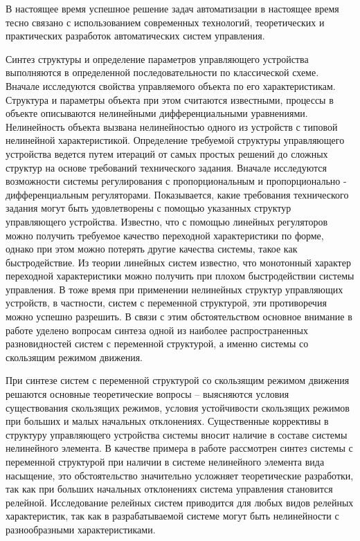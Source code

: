 	В настоящее время успешное решение задач автоматизации в настоящее время тесно связано с использованием современных технологий, теоретических и практических разработок автоматических систем управления.
	
Синтез структуры и определение параметров управляющего устройства выполняются в определенной последовательности по классической схеме. Вначале исследуются свойства управляемого объекта по его характеристикам. Структура и параметры объекта при этом считаются известными, процессы в объекте описываются нелинейными дифференциальными уравнениями. Нелинейность объекта вызвана нелинейностью одного из устройств с типовой нелинейной характеристикой. Определение требуемой структуры управляющего устройства ведется путем итераций от самых простых решений до сложных структур на основе требований технического задания. Вначале исследуются возможности системы регулирования с пропорциональным и пропорционально - дифференциальным регуляторами. Показывается, какие требования технического задания могут быть удовлетворены с помощью указанных структур управляющего устройства. Известно, что с помощью линейных регуляторов можно получить требуемое качество переходной характеристики по форме, однако при этом можно потерять другие качества системы, такое как быстродействие.  Из теории линейных систем известно, что монотонный характер переходной характеристики  можно получить при плохом быстродействии системы управления. В тоже время при применении нелинейных структур управляющих устройств, в частности, систем с переменной структурой,  эти противоречия можно успешно разрешить. В связи с этим обстоятельством основное внимание в работе уделено вопросам синтеза одной из наиболее распространенных разновидностей систем с переменной структурой,  а именно системы со скользящим режимом движения.

При синтезе систем с переменной структурой со скользящим режимом движения решаются основные теоретические вопросы – выясняются условия существования скользящих режимов, условия устойчивости скользящих режимов  при  больших и малых начальных отклонениях. Существенные коррективы в структуру управляющего устройства системы вносит наличие в составе системы нелинейного элемента. В  качестве примера в работе рассмотрен синтез системы с переменной структурой при наличии в системе нелинейного элемента  вида насыщение, это обстоятельство значительно усложняет теоретические разработки, так как при больших начальных отклонениях  система управления становится релейной. Исследование релейных систем приводится для любых видов релейных  характеристик, так как в разрабатываемой системе могут быть нелинейности с разнообразными характеристиками.
